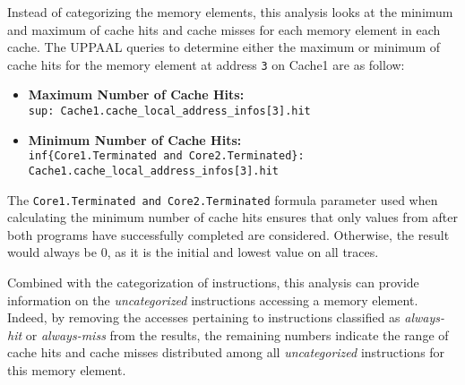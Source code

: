 Instead of categorizing the memory elements, this analysis looks at the minimum
and maximum of cache hits and cache misses for each memory element in each
cache. The UPPAAL queries to determine either the maximum or minimum of cache
hits for the memory element at address \lstinline!3! on Cache1 are as follow:
\begin{itemize}
\item \textbf{Maximum Number of Cache Hits:}\\
   \lstinline!sup: Cache1.cache_local_address_infos[3].hit!
\item \textbf{Minimum Number of Cache Hits:}\\
   \lstinline!inf{Core1.Terminated and Core2.Terminated}: Cache1.cache_local_address_infos[3].hit!
\end{itemize}
The \lstinline!Core1.Terminated and Core2.Terminated! formula parameter used
when calculating the minimum number of cache hits ensures that only values from
after both programs have successfully completed are considered. Otherwise, the
result would always be 0, as it is the initial and lowest value on all traces.

Combined with the categorization of instructions, this analysis can provide
information on the \textit{uncategorized} instructions accessing
a memory element. Indeed, by removing the accesses pertaining to instructions
classified as \textit{always-hit} or \textit{always-miss} from the results, the
remaining numbers indicate the range of cache hits and cache misses distributed
among all \textit{uncategorized} instructions for this memory element.

